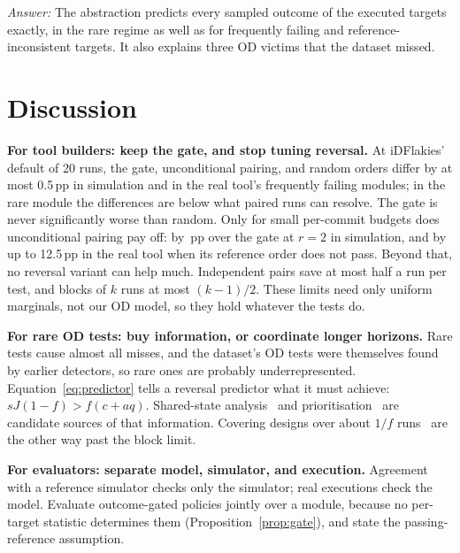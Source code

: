 \documentclass[conference,letterpaper]{IEEEtran}
\theoremstyle{definition}
\newcommand{\pp}{\,pp}
\begin{document}
\textit{Answer:} The abstraction predicts every sampled outcome of the \ExecAllTargets{} executed targets exactly, in the rare regime as well as for frequently failing and reference-inconsistent targets. It also explains three OD victims that the dataset missed.

\section{Discussion}\label{sec:discussion}
\textbf{For tool builders: keep the gate, and stop tuning reversal.} At iDFlakies' default of 20 runs, the gate, unconditional pairing, and random orders differ by at most 0.5\pp{} in simulation and in the real tool's frequently failing modules; in the rare module the differences are below what \IdfRunsMarine{} paired runs can resolve. The gate is never significantly worse than random. Only for small per-commit budgets does unconditional pairing pay off: by \KRPairMinusGateTwo\pp{} over the gate at $r=2$ in simulation, and by up to 12.5\pp{} in the real tool when its reference order does not pass. Beyond that, no reversal variant can help much. Independent pairs save at most half a run per test, and blocks of $k$ runs at most $(k-1)/2$. These limits need only uniform marginals, not our OD model, so they hold whatever the tests do.

\textbf{For rare OD tests: buy information, or coordinate longer horizons.} Rare tests cause almost all misses, and the dataset's OD tests were themselves found by earlier detectors, so rare ones are probably underrepresented. Equation~\eqref{eq:predictor} tells a reversal predictor what it must achieve: $sJ(1-f)>f(c+aq)$. Shared-state analysis~\cite{gyori2015poldet,bell2015electrictest,gambi2018pradet} and prioritisation~\cite{iqbal2025ftw} are candidate sources of that information. Covering designs over about $1/f$ runs~\cite{wei2021tacas,li2023issta} are the other way past the block limit.

\textbf{For evaluators: separate model, simulator, and execution.} Agreement with a reference simulator checks only the simulator; real executions check the model. Evaluate outcome-gated policies jointly over a module, because no per-target statistic determines them (Proposition~\ref{prop:gate}), and state the passing-reference assumption.
\end{document}
